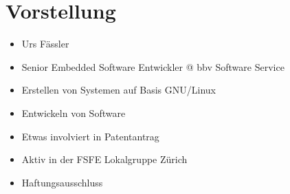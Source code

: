 \section{Vorstellung}
\begin{frame}
	\begin{itemize}
		\item Urs Fässler
		\item Senior Embedded Software Entwickler @ bbv Software Service
		\item Erstellen von Systemen auf Basis GNU/Linux
		\item Entwickeln von Software
		\item Etwas involviert in Patentantrag
		\item Aktiv in der FSFE Lokalgruppe Zürich
	\end{itemize}
\end{frame}

\begin{frame}
	\begin{itemize}
		\item Haftungsausschluss
	\end{itemize}
\end{frame}
